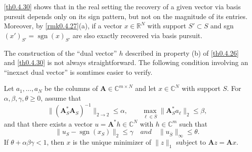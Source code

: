 \begin{remark}
    \label{rmk0.4.31}
    \cref{th0.4.30} shows that in the real setting the recovery of a given vector via basis pursuit depends only on its sign pattern, but not on the magnitude of its entries. Moreover, by \cref{rmk0.4.27}(a), if a vector $x \in \mathbb{R}^N$ with support $S' \subset S$ and sgn$(x')_{S'} = \mathop{\mathrm{sgn}}(x)_{S'}$ are slso exactly recovered via basis pursuit.
\end{remark}

The construction of the ``dual vector'' $h$ described in property (b) of \cref{th0.4.26} and \cref{th0.4.30} is not always straightforward. The following condition involving an ``inexact dual vector'' is somtimes easier to verify.

\begin{theorem}
    \label{th0.4.32}
    Let $a_1,\dots,a_N$ be the columns of $\mathbf{A} \in \mathbb{C}^{m \times N}$ and let $x \in \mathbb{C}^N$ with support $S$. For $\alpha,\beta,\gamma,\theta \geq 0$, assume that
    \begin{equation}
        \|(\mathbf{A}^*_S \mathbf{A}_S)^{-1}\|_{2 \rightarrow 2} \leq \alpha, \qquad \max\limits_{\ell \in \overline{S}}^{}\|\mathbf{A}^*_S a_{\ell}\|_2 \leq \beta,
        \label{eq0.4.25}
    \end{equation}
    and that there exists a vector $u = \mathbf{A}^*h \in \mathbb{C}^N$ with $h \in \mathbb{C}^m $ such that 
    \begin{equation}
        \|u_S - \mathop{\mathrm{sgn}}(x_S)\|_2 \leq \gamma \quad and \quad \|u_{\overline{S}}\|_{\infty} \leq \theta.
        \label{eq0.4.26}
    \end{equation}
    If $\theta + \alpha\beta\gamma<1$, then $x$ is the unique minimizer of $\|z\|_1$ subject to $\mathbf{A}z = \mathbf{A}x$. 
\end{theorem}

